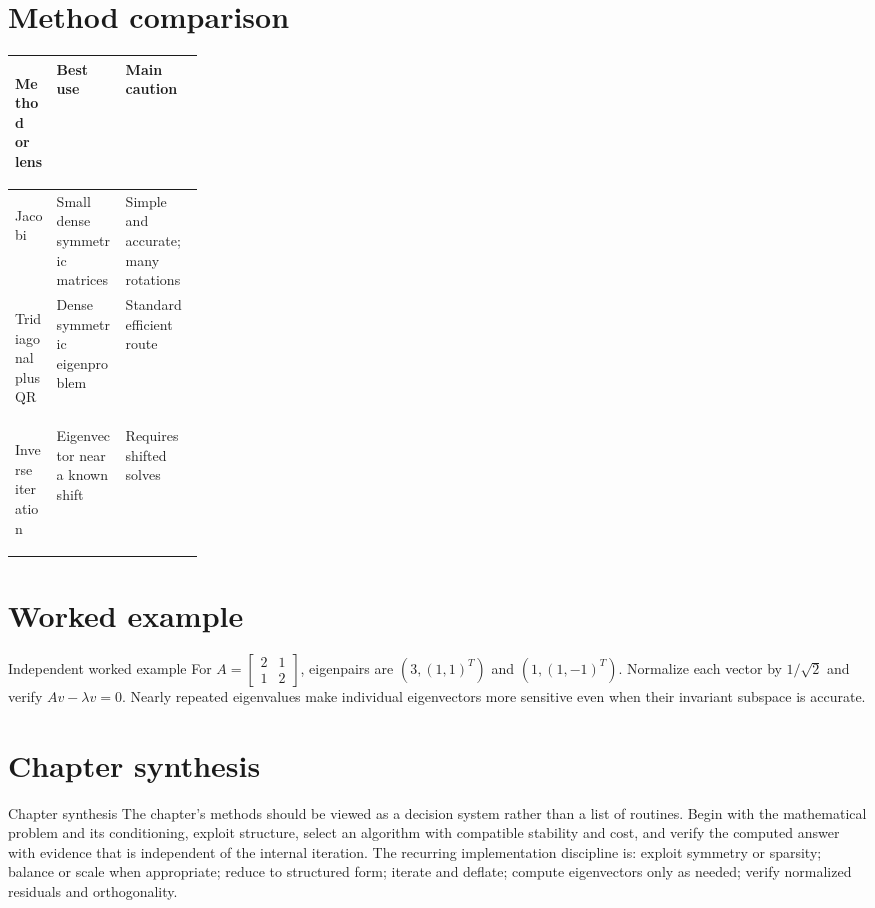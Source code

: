 \documentclass[10pt,letterpaper]{article}
\begin{document}
\section*{Method comparison}
\begin{center}
\small
\begin{tabularx}{\linewidth}{>{\bfseries\raggedright\arraybackslash}p{0.22\linewidth}XX}
\toprule
Method or lens & Best use & Main caution \\
\midrule
Jacobi & Small dense symmetric matrices & Simple and accurate; many rotations \\
Tridiagonal plus QR & Dense symmetric eigenproblem & Standard efficient route \\
Inverse iteration & Eigenvector near a known shift & Requires shifted solves \\
\bottomrule
\end{tabularx}
\end{center}

\section*{Worked example}
\begin{exambox}{Independent worked example}
For $A=\begin{bmatrix}2&1\\1&2\end{bmatrix}$, eigenpairs are $(3,(1,1)^T)$ and $(1,(1,-1)^T)$.  Normalize each vector by $1/\sqrt2$ and verify $Av-\lambda v=0$.  Nearly repeated eigenvalues make individual eigenvectors more sensitive even when their invariant subspace is accurate.
\end{exambox}

\section*{Chapter synthesis}
\begin{summarybox}{Chapter synthesis}
The chapter's methods should be viewed as a decision system rather than a list of routines.  Begin with the mathematical problem and its conditioning, exploit structure, select an algorithm with compatible stability and cost, and verify the computed answer with evidence that is independent of the internal iteration.  The recurring implementation discipline is: exploit symmetry or sparsity; balance or scale when appropriate; reduce to structured form; iterate and deflate; compute eigenvectors only as needed; verify normalized residuals and orthogonality.
\end{summarybox}
\end{document}
